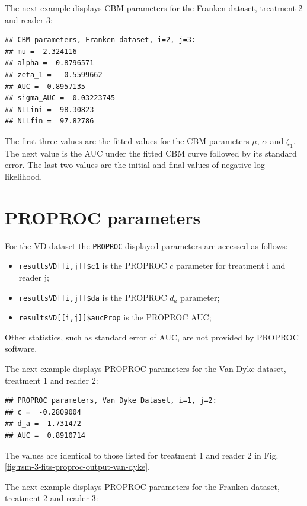 \documentclass[
]{book}
\providecommand{\tightlist}{%
  \setlength{\itemsep}{0pt}\setlength{\parskip}{0pt}}
\begin{document}
The next example displays CBM parameters for the Franken dataset, treatment 2 and reader 3:

\begin{verbatim}
## CBM parameters, Franken dataset, i=2, j=3: 
## mu =  2.324116 
## alpha =  0.8796571 
## zeta_1 =  -0.5599662 
## AUC =  0.8957135 
## sigma_AUC =  0.03223745 
## NLLini =  98.30823 
## NLLfin =  97.82786
\end{verbatim}

The first three values are the fitted values for the CBM parameters \(\mu\), \(\alpha\) and \(\zeta_1\). The next value is the AUC under the fitted CBM curve followed by its standard error. The last two values are the initial and final values of negative log-likelihood.

\hypertarget{rsm-3-fits-proproc-parameters}{%
\section{PROPROC parameters}\label{rsm-3-fits-proproc-parameters}}

For the VD dataset the \texttt{PROPROC} displayed parameters are accessed as follows:

\begin{itemize}
\tightlist
\item
  \texttt{resultsVD{[}{[}i,j{]}{]}\$c1} is the PROPROC \(c\) parameter for treatment i and reader j;
\item
  \texttt{resultsVD{[}{[}i,j{]}{]}\$da} is the PROPROC \(d_a\) parameter;\\
\item
  \texttt{resultsVD{[}{[}i,j{]}{]}\$aucProp} is the PROPROC AUC;
\end{itemize}

Other statistics, such as standard error of AUC, are not provided by PROPROC software.

The next example displays PROPROC parameters for the Van Dyke dataset, treatment 1 and reader 2:

\begin{verbatim}
## PROPROC parameters, Van Dyke Dataset, i=1, j=2: 
## c =  -0.2809004 
## d_a =  1.731472 
## AUC =  0.8910714
\end{verbatim}

The values are identical to those listed for treatment 1 and reader 2 in Fig. \ref{fig:rsm-3-fits-proproc-output-van-dyke}.

The next example displays PROPROC parameters for the Franken dataset, treatment 2 and reader 3:
\end{document}
